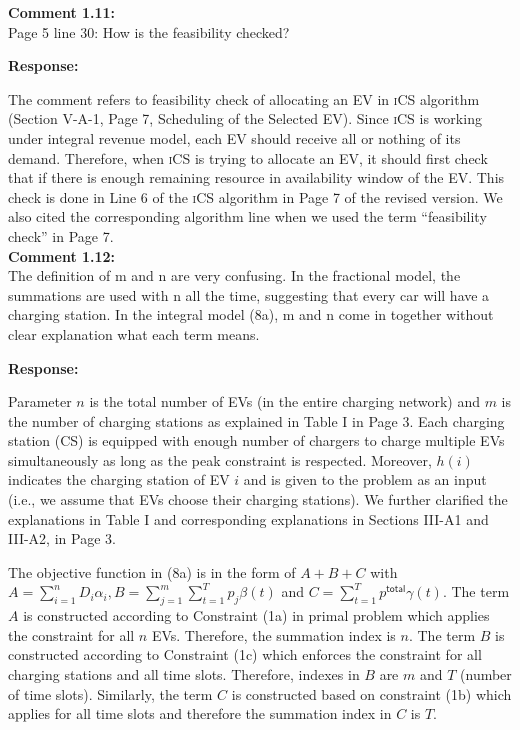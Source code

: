 \documentclass[11pt]{article}
\newcommand{\ics}{\textsc{iCS}\xspace}
\newcommand{\rev}[1]{{\color{black}#1}}%
\newcommand{\rev}[1]{#1}
\begin{document}
\vspace{5mm}
{
{\color{blue}\noindent\textbf{Comment 1.11:}\\
Page 5 line 30: How is the feasibility checked?
}}

\vspace{5mm}
\noindent\textbf{Response:}

The comment refers to feasibility check of allocating an EV in \ics algorithm (Section V-A-1, Page 7, Scheduling of the Selected EV). Since \ics is working under integral revenue model, each EV should receive all or nothing of its demand. Therefore, when \ics is trying to allocate an EV, it should first check that if there is enough remaining resource in availability window of the EV. This check is done in Line 6 of the \ics algorithm in Page 7 of the revised version. \rev{We also cited the corresponding algorithm line  when we used the term ``feasibility check'' in Page 7.} 
\\

\vspace{5mm}
{
{\color{blue}\noindent\textbf{Comment 1.12:}\\
The definition of m and n are very confusing. In the fractional model, the summations are used with n all the time, suggesting that every car will have a charging station. In the integral model (8a), m and n come in together without clear explanation what each term means. 
}}

\vspace{5mm}
\noindent\textbf{Response:}

Parameter $n$ is the total number of EVs (in the entire charging network) and $m$ is the number of charging stations as explained in Table I in Page 3. Each charging station (CS) is equipped with enough number of chargers to charge multiple EVs simultaneously as long as the peak constraint is respected. Moreover, $h(i)$ indicates the charging station of EV $i$ and is given to the problem as an input (i.e., we assume that EVs choose their charging stations). 
We further clarified the explanations in Table I and corresponding explanations in Sections III-A1 and III-A2, in Page 3.

The objective function in (8a) is in the form of $A+B+C$ with $A=\sum_{i=1}^n D_i\alpha _i, B=\sum_{j=1}^m \sum_{t=1}^T p_j\beta (t)$ and $C=\sum_{t=1}^T p^\mathsf{total}\gamma (t)$. 
The term $A$ is constructed according to Constraint (1a) in primal problem which applies the constraint for all $n$ EVs. Therefore, the summation index is $n$. The term $B$ is constructed according to Constraint (1c) which enforces the constraint for all charging stations and all time slots. Therefore, indexes in $B$ are $m$ and $T$ (number of time slots). Similarly, the term $C$ is constructed based on constraint (1b) which applies for all time slots and therefore the summation index in $C$ is $T$.
\end{document}
